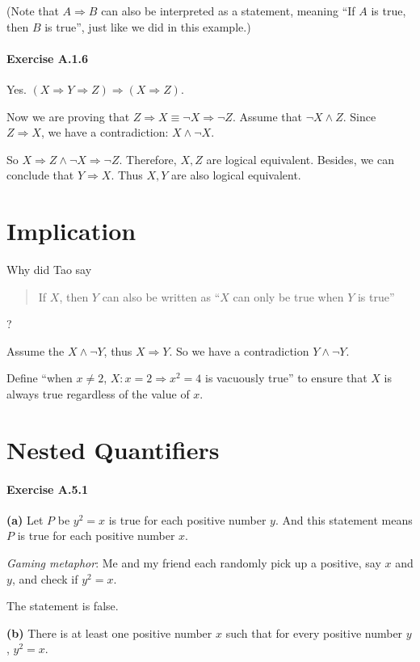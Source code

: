 (Note that $A \Longrightarrow B$ can also be interpreted as a statement, meaning ``If $A$ is true, then $B$ 
is true'', just like we did in this example.)

\paragraph{Exercise A.1.6}
\label{exercisea.1.6}
Yes. $(X \Longrightarrow Y \Longrightarrow Z) \Longrightarrow (X \Longrightarrow Z)$. 

Now we are proving that 
$Z \Longrightarrow X \equiv \neg X \Longrightarrow \neg Z$. Assume that $\neg X \wedge Z$. Since 
$Z \Longrightarrow X$, we have a contradiction: $X \wedge \neg X$.

So $X \Longrightarrow Z \wedge \neg X \Longrightarrow \neg Z$. Therefore, $X,Z$ are logical equivalent. 
Besides, we can conclude that $Y \Longrightarrow X$. Thus $X,Y$ are also logical equivalent.

\section{Implication}
Why did Tao say
\begin{quotation}
If $X$, then $Y$ can also be written as ``$X$ can only be true when $Y$ is true''
\end{quotation}?

Assume the $X \wedge \neg Y$, thus $X \Longrightarrow Y$. So we have a contradiction 
$Y \wedge \neg Y$.

Define ``when $x \neq 2$, $X:x=2 \Longrightarrow x^2=4$ is vacuously true'' to ensure that $X$ is 
always true regardless of the value of $x$.

\section{Nested Quantifiers}
\paragraph{Exercise A.5.1} \label{exercisea.5.1}
\textbf{(a)} Let $P$ be $y^2=x$ is true for each positive number $y$. And this statement means $P$ is 
true for each positive number $x$. 

\emph{Gaming metaphor}: Me and my friend each randomly pick up a positive, say $x$ and $y$, and check 
if $y^2=x$.

The statement is false.

\textbf{(b)} There is at least one positive number $x$ such that for every positive number $y$, 
$y^2=x$.

